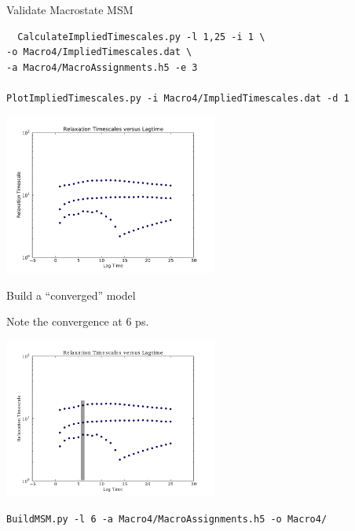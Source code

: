 \documentclass[10pt]{beamer}
\begin{document}
\begin{frame}[fragile]{Validate Macrostate MSM}
 \begin{verbatim}
  CalculateImpliedTimescales.py -l 1,25 -i 1 \
-o Macro4/ImpliedTimescales.dat \
-a Macro4/MacroAssignments.h5 -e 3

PlotImpliedTimescales.py -i Macro4/ImpliedTimescales.dat -d 1

 \end{verbatim}

 \includegraphics[width=7.0cm]{Figures/macro_implied.pdf}
 
\end{frame}

\begin{frame}[fragile]{Build a ``converged'' model}

Note the convergence at 6 ps.

\includegraphics[width=7.0cm]{Figures/macro_implied-cut.pdf}

 \begin{verbatim}
BuildMSM.py -l 6 -a Macro4/MacroAssignments.h5 -o Macro4/   
 \end{verbatim}


\end{frame}
\end{document}
